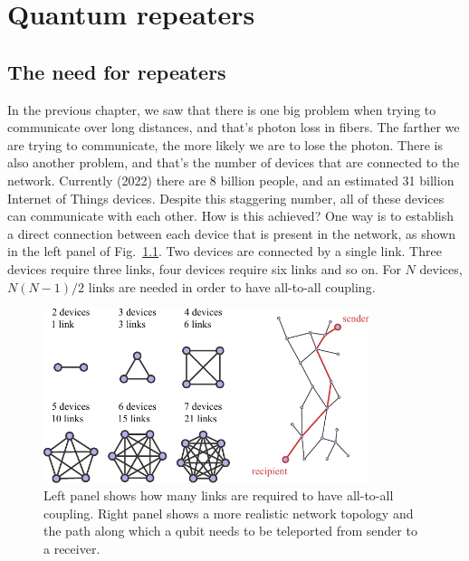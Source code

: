 \chapter{Quantum repeaters}
\label{sec:12_quantum_repeaters}
\label{ch:repeaters}

\section{The need for repeaters}
\label{sec:12-1_need_for_repeaters}

In the previous chapter, we saw that there is one big problem when trying to communicate over long distances, and that's photon loss in fibers.
The farther we are trying to communicate, the more likely we are to lose the photon.
There is also another problem, and that's the number of devices that are connected to the network. Currently (2022) there are 8 billion people, and an estimated 31 billion Internet of Things devices.
Despite this staggering number, all of these devices can communicate with each other.
How is this achieved?
One way is to establish a direct connection between each device that is present in the network, as shown in the left panel of Fig.~\ref{fig:12-1_all_to_all}.
Two devices are connected by a single link.
Three devices require three links, four devices require six links and so on.
For $N$ devices, $N (N - 1) / 2$ links are needed in order to have all-to-all coupling.

\begin{figure}[t]
    \centering
    \includegraphics[width=0.85\textwidth]{lesson12/12-1_all_to_all.pdf}
    \caption[All-to-all coupling]{Left panel shows how many links are required to have all-to-all coupling. Right panel shows a more realistic network topology and the path along which a qubit needs to be teleported from sender to a receiver.}
    \label{fig:12-1_all_to_all}
\end{figure}

